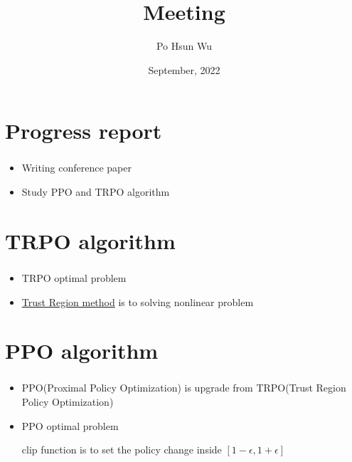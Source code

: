 \documentclass{beamer}
\date{September, 2022}
\title{Meeting}
\author{Po Hsun Wu}
\begin{document}
    \maketitle

    \section{Progress report}
    \begin{frame}
        \frametitle{\secname}

        \begin{itemize}
            \item Writing conference paper
            \item Study PPO and TRPO algorithm
        \end{itemize}
    \end{frame}

    \section{TRPO algorithm}
    \begin{frame}
        \frametitle{\secname}

        \begin{itemize}
            \item TRPO optimal problem
            
            \item \href{https://optimization.mccormick.northwestern.edu/index.php/Trust-region_methods}{Trust Region method} is to solving nonlinear problem
            
        \end{itemize}
    \end{frame}

    \section{PPO algorithm}
    \begin{frame}
        \frametitle{\secname}

        \begin{itemize}
            \item PPO(Proximal Policy Optimization) is upgrade from TRPO(Trust Region Policy Optimization)
            \item PPO optimal problem
            
            clip function is to set the policy change inside $\left[1-\epsilon, 1+\epsilon\right]$
        \end{itemize}
    \end{frame}
\end{document}
